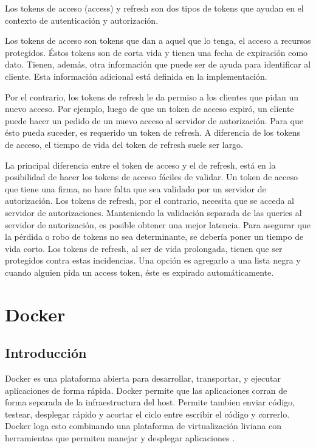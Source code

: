 Los tokens de acceso (access) y refresh son dos tipos de tokens que ayudan en el contexto de autenticación y autorización.

Los tokens de acceso son tokens que dan a aquel que lo tenga, el acceso a recursos protegidos. Éstos tokens son de corta vida y tienen una fecha de expiración como dato. Tienen, además, otra información que puede ser de ayuda para identificar al cliente. Esta información adicional está definida en la implementación.

Por el contrario, los tokens de refresh le da permiso a los clientes que pidan un nuevo acceso. Por ejemplo, luego de que un token de acceso expiró, un cliente puede hacer un pedido de un nuevo acceso al servidor de autorización. Para que ésto pueda suceder, es requerido un token de refresh.
A diferencia de los tokens de acceso, el tiempo de vida del token de refresh suele ser largo.

La principal diferencia entre el token de acceso y el de refresh, está en la posibilidad de hacer los tokens de acceso fáciles de validar. Un token de acceso que tiene una firma, no hace falta que sea validado por un servidor de autorización.
Los tokens de refresh, por el contrario, necesita que se acceda al servidor de autorizaciones. Manteniendo la validación separada de las queries al servidor de autorización, es posible obtener una mejor latencia.
Para asegurar que la pérdida o robo de tokens no sea determinante, se debería poner un tiempo de vida corto.
Los tokens de refresh, al ser de vida prolongada, tienen que ser protegidos contra estas incidencias. 
Una opción es agregarlo a una lista negra y cuando alguien pida un access token, éste es expirado automáticamente.

\section[Docker]{Docker}

\subsection[Introducción]{Introducción}

Docker es una plataforma abierta para desarrollar, transportar, y ejecutar aplicaciones de forma rápida. Docker permite que las aplicaciones corran de forma separada de la infraestructura del host. Permite tambien enviar código, testear, desplegar rápido y acortar el ciclo entre escribir el código y correrlo. Docker loga esto combinando una plataforma de virtualización liviana con herramientas que permiten manejar y desplegar aplicaciones \cite{Dj}.

